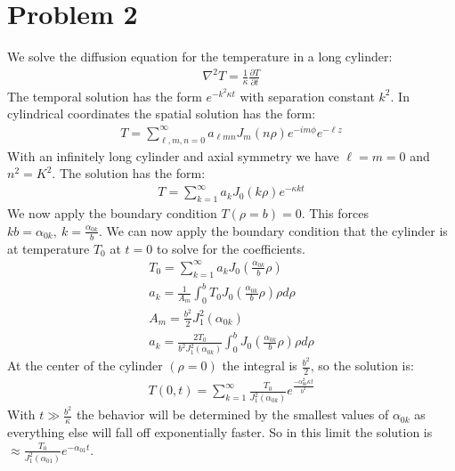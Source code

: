 \documentclass[a4paper,12pt]{article}
\numberwithin{equation}{section}
\begin{document}
\section{Problem 2}
We solve the diffusion equation for the temperature in a long cylinder:
\begin{gather}
 \nabla^2T=\frac{1}{\kappa}\frac{\partial T}{\partial t}
\end{gather}
The temporal solution has the form $e^{-k^2\kappa t}$ with separation constant $k^2$.
In cylindrical coordinates the spatial solution has the form:
\begin{gather}
 T=\sum_{\ell,m,n=0}^{\infty}a_{\ell mn}J_m(n\rho)e^{-im\phi}e^{-\ell z}
\end{gather}
With an infinitely long cylinder and axial symmetry we have $\ell=m=0$ and $n^2=K^2$.
The solution has the form:
\begin{gather}
 T=\sum_{k=1}^{\infty}a_{k}J_0(k\rho )e^{-\kappa kt}
\end{gather}
We now apply the boundary condition $T(\rho =b)=0$. This forces $kb=\alpha_{0k},\ k=\frac{\alpha_{0k}}{b}$.
We can now apply the boundary condition that the cylinder is at temperature $T_0$ at $t=0$ to solve for the coefficients.
\begin{gather}
 T_0=\sum_{k=1}^{\infty}a_kJ_0(\frac{\alpha_{0k}}{b}\rho)\\
 a_k=\frac{1}{A_m}\int_{0}^{b}T_0 J_0(\frac{\alpha_{0k}}{b}\rho)\rho d\rho\\
 A_m=\frac{b^2}{2}J_{1}^2(\alpha_{0k})\\
 a_k=\frac{2T_0}{b^2J_{1}^2(\alpha_{0k})}\int_{0}^{b}J_0(\frac{\alpha_{0k}}{b}\rho)\rho d\rho
\end{gather}
At the center of the cylinder $(\rho=0)$ the integral is $\frac{b^2}{2}$, so the solution is:
\begin{gather}
 T(0,t)=\sum_{k=1}^{\infty}   \frac{T_0}{J_{1}^2(\alpha_{0k})}  e^{\frac{-\alpha_{0k}^2\kappa t}{b^2}}
\end{gather}
With $t\gg \frac{b^2}{\kappa}$ the behavior will be determined by the smallest values of $\alpha_{0k}$ as everything else will fall off exponentially faster.
So in this limit the solution is $\approx \frac{T_0}{J_{1}^2(\alpha_{01})}e^{-\alpha_{01}t}$.
\\
\end{document}
